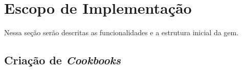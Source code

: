 \section{Escopo de Implementação}
\label{sec:escopo}
Nessa seção serão descritas as funcionalidades e a estrutura inicial da gem.


\subsection{Criação de \textit{Cookbooks}}
